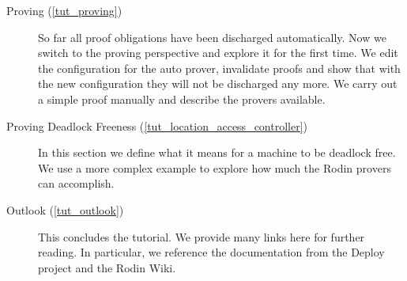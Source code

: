 \begin{description}
	\item[Proving (\ref{tut_proving})] So far all proof obligations have been discharged automatically.  Now we switch to the proving perspective and explore it for the first time.
We edit the configuration for the auto prover, invalidate proofs and show that with the new configuration they will not be discharged any more.  We carry out a simple proof manually and describe the provers available.
	\item[Proving Deadlock Freeness (\ref{tut_location_access_controller})] In this section we define what it means for a machine to be deadlock free. We use a more complex example to explore how much the Rodin provers can accomplish.
	\item[Outlook (\ref{tut_outlook})] This concludes the tutorial. We provide many links here for further reading.  In particular, we reference the documentation from the Deploy project and the Rodin Wiki.
\end{description}

